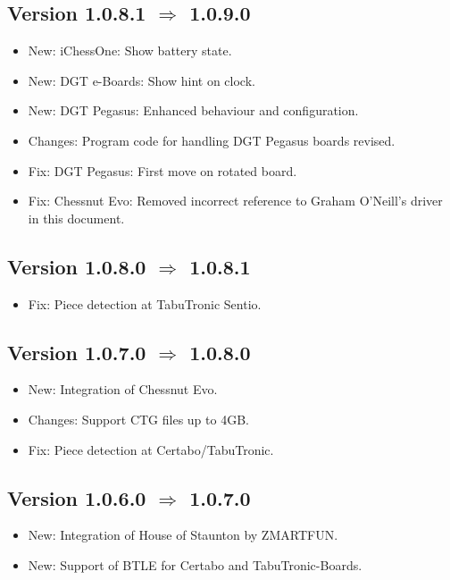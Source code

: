 \documentclass[11pt,a4paper]{article}
\begin{document}
\subsection*{Version 1.0.8.1 $\Rightarrow$  1.0.9.0}
\begin{itemize}			
	\item {\color{blue}New}: iChessOne: Show battery state.
	\item {\color{blue}New}: DGT e-Boards: Show hint on clock.
	\item {\color{blue}New}: DGT Pegasus: Enhanced behaviour and configuration.
	\item {\color{teal}Changes}: Program code for handling DGT Pegasus boards revised.
	\item {\color{red}Fix}: DGT Pegasus: First move on rotated board.
    \item {\color{red}Fix}: Chessnut Evo: Removed incorrect reference to Graham O'Neill's driver in this document.
\end{itemize}


\subsection*{Version 1.0.8.0 $\Rightarrow$  1.0.8.1}
\begin{itemize}			
	\item {\color{red}Fix}: Piece detection at TabuTronic Sentio. 
\end{itemize}


\subsection*{Version 1.0.7.0 $\Rightarrow$  1.0.8.0}
\begin{itemize}			
	\item {\color{blue}New}: Integration of Chessnut Evo.
    \item {\color{teal}Changes}: Support CTG files up to 4GB.
    \item {\color{red}Fix}: Piece detection at Certabo/TabuTronic.
\end{itemize}


\subsection*{Version 1.0.6.0 $\Rightarrow$  1.0.7.0}
\begin{itemize}			
	\item {\color{blue}New}: Integration of House of Staunton by ZMARTFUN.
	\item {\color{blue}New}: Support of BTLE for Certabo and TabuTronic-Boards.
\end{itemize}
\end{document}

